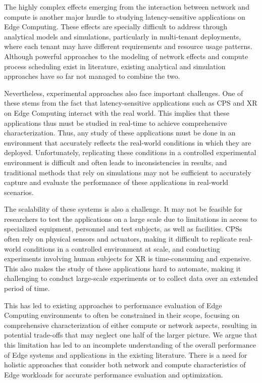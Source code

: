 The highly complex effects emerging from the interaction between network and compute is another major hurdle to studying latency-sensitive applications on Edge Computing.
These effects are specially difficult to address through analytical models and simulations, particularly in multi-tenant deployments, where each tenant may have different requirements and resource usage patterns.
Although powerful approaches to the modeling of network effects and compute process scheduling exist in literature, existing analytical and simulation approaches have so far not managed to combine the two.

Nevertheless, experimental approaches also face important challenges.
One of these stems from the fact that latency-sensitive applications such as \gls{CPS} and \gls{XR} on Edge Computing interact with the real world.
This implies that these applications thus must be studied in real-time to achieve comprehensive characterization.
Thus, any study of these applications must be done in an environment that accurately reflects the real-world conditions in which they are deployed.
Unfortunately, replicating these conditions in a controlled experimental environment is difficult and often leads to inconsistencies in results, and traditional methods that rely on simulations may not be sufficient to accurately capture and evaluate the performance of these applications in real-world scenarios.

The scalability of these systems is also a challenge.
It may not be feasible for researchers to test the applications on a large scale due to limitations in access to specialized equipment, personnel and test subjects, as well as facilities.
\glspl{CPS} often rely on physical sensors and actuators, making it difficult to replicate real-world conditions in a controlled environment at scale, and conducting experiments involving human subjects for \gls{XR} is time-consuming and expensive.
This also makes the study of these applications hard to automate, making it challenging to conduct large-scale experiments or to collect data over an extended period of time.

This has led to existing approaches to performance evaluation of Edge Computing environments to often be constrained in their scope, focusing on comprehensive characterization of either compute or network aspects, resulting in potential trade-offs that may neglect one half of the larger picture.
We argue that this limitation has led to an incomplete understanding of the overall performance of Edge systems and applications in the existing literature.
There is a need for holistic approaches that consider both network and compute characteristics of Edge workloads for accurate performance evaluation and optimization.

